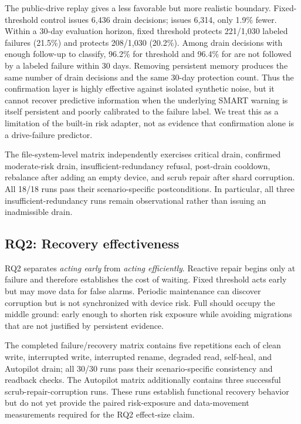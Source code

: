 

The public-drive replay gives a less favorable but more realistic boundary. Fixed-threshold control issues 6,436 drain decisions; \autopilot{} issues 6,314, only 1.9\% fewer. Within a 30-day evaluation horizon, fixed threshold protects 221/1,030 labeled failures (21.5\%) and \autopilot{} protects 208/1,030 (20.2\%). Among drain decisions with enough follow-up to classify, 96.2\% for threshold and 96.4\% for \autopilot{} are not followed by a labeled failure within 30 days. Removing persistent memory produces the same number of drain decisions and the same 30-day protection count. Thus the confirmation layer is highly effective against isolated synthetic noise, but it cannot recover predictive information when the underlying SMART warning is itself persistent and poorly calibrated to the failure label. We treat this as a limitation of the built-in risk adapter, not as evidence that confirmation alone is a drive-failure predictor.

The file-system-level matrix independently exercises critical drain, confirmed moderate-risk drain, insufficient-redundancy refusal, post-drain cooldown, rebalance after adding an empty device, and scrub repair after shard corruption. All 18/18 runs pass their scenario-specific postconditions. In particular, all three insufficient-redundancy runs remain observational rather than issuing an inadmissible drain.



\subsection{RQ2: Recovery effectiveness}
RQ2 separates \emph{acting early} from \emph{acting efficiently}. Reactive repair begins only at failure and therefore establishes the cost of waiting. Fixed threshold acts early but may move data for false alarms. Periodic maintenance can discover corruption but is not synchronized with device risk. Full \autopilot{} should occupy the middle ground: early enough to shorten risk exposure while avoiding migrations that are not justified by persistent evidence.



The completed failure/recovery matrix contains five repetitions each of clean write, interrupted write, interrupted rename, degraded read, self-heal, and Autopilot drain; all 30/30 runs pass their scenario-specific consistency and readback checks. The Autopilot matrix additionally contains three successful scrub-repair-corruption runs. These runs establish functional recovery behavior but do not yet provide the paired risk-exposure and data-movement measurements required for the RQ2 effect-size claim.


